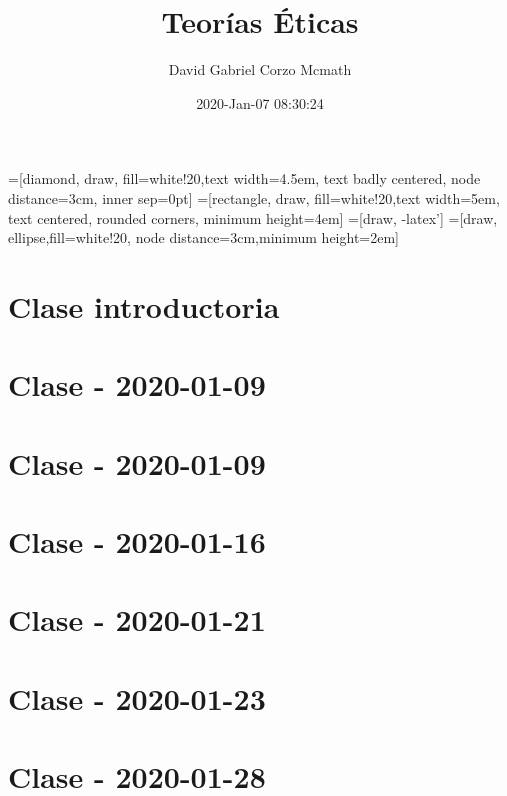 \documentclass[openany]{book}
\title{Teorías Éticas}
\author{David Gabriel Corzo Mcmath}
\date{2020-Jan-07 08:30:24}
\begin{document}
\maketitle
\tableofcontents

=[diamond, draw, fill=white!20,text width=4.5em, text badly centered, node distance=3cm, inner sep=0pt]
=[rectangle, draw, fill=white!20,text width=5em, text centered, rounded corners, minimum height=4em]
=[draw, -latex']
=[draw, ellipse,fill=white!20, node distance=3cm,minimum height=2em]


\chapter{Clase introductoria}


\chapter{Clase - 2020-01-09}


\chapter{Clase - 2020-01-09}


\chapter{Clase - 2020-01-16}


\chapter{Clase - 2020-01-21}


\chapter{Clase - 2020-01-23}


\chapter{Clase - 2020-01-28}

\end{document}
